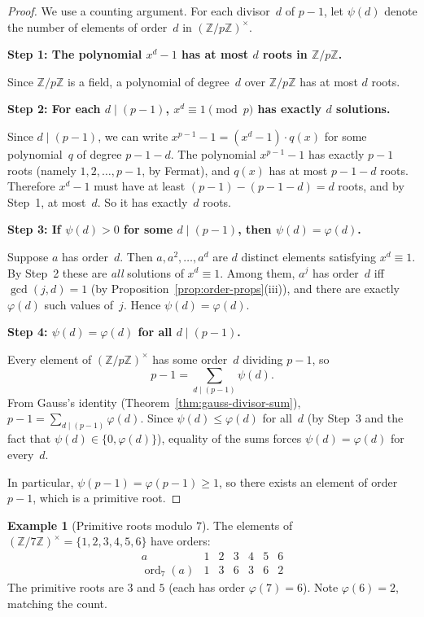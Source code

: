 \documentclass[12pt,a4paper,openany]{book}
\theoremstyle{definition}
\newtheorem{example}[definition]{Example}
\theoremstyle{plain}
\theoremstyle{remark}
\newcommand{\Z}{\mathbb{Z}}
\DeclareMathOperator{\ord}{ord}
\begin{document}
\begin{proof}
We use a counting argument.  For each divisor~$d$ of $p-1$, let
$\psi(d)$ denote the number of elements of order~$d$ in $(\Z/p\Z)^\times$.

\medskip\noindent
\textbf{Step 1: The polynomial $x^d - 1$ has at most $d$ roots in $\Z/p\Z$.}

Since $\Z/p\Z$ is a field, a polynomial of degree~$d$ over $\Z/p\Z$ has
at most $d$ roots.

\medskip\noindent
\textbf{Step 2: For each $d \mid (p-1)$, $x^d \equiv 1 \pmod{p}$ has
exactly $d$ solutions.}

Since $d \mid (p-1)$, we can write $x^{p-1} - 1 = (x^d - 1)\cdot q(x)$
for some polynomial~$q$ of degree $p-1-d$.  The polynomial $x^{p-1} - 1$
has exactly $p-1$ roots (namely $1, 2, \dots, p-1$, by Fermat), and $q(x)$
has at most $p-1-d$ roots.  Therefore $x^d - 1$ must have at least
$(p-1) - (p-1-d) = d$ roots, and by Step~1, at most~$d$.  So it has exactly~$d$
roots.

\medskip\noindent
\textbf{Step 3: If $\psi(d) > 0$ for some $d \mid (p-1)$, then $\psi(d) = \varphi(d)$.}

Suppose $a$ has order~$d$.  Then $a, a^2, \dots, a^d$ are $d$ distinct
elements satisfying $x^d \equiv 1$.  By Step~2 these are \emph{all}
solutions of $x^d \equiv 1$.  Among them, $a^j$ has order~$d$ iff
$\gcd(j,d) = 1$ (by Proposition~\ref{prop:order-props}(iii)), and there
are exactly $\varphi(d)$ such values of~$j$.  Hence $\psi(d) = \varphi(d)$.

\medskip\noindent
\textbf{Step 4: $\psi(d) = \varphi(d)$ for all $d \mid (p-1)$.}

Every element of $(\Z/p\Z)^\times$ has some order~$d$ dividing $p-1$, so
\[
  p - 1 = \sum_{d \mid (p-1)} \psi(d).
\]
From Gauss's identity (Theorem~\ref{thm:gauss-divisor-sum}),
$p - 1 = \sum_{d \mid (p-1)} \varphi(d)$.  Since $\psi(d) \le \varphi(d)$
for all~$d$ (by Step~3 and the fact that $\psi(d) \in \{0, \varphi(d)\}$),
equality of the sums forces $\psi(d) = \varphi(d)$ for every~$d$.

\medskip\noindent
In particular, $\psi(p-1) = \varphi(p-1) \ge 1$, so there exists an
element of order~$p-1$, which is a primitive root.
\end{proof}

\begin{example}[Primitive roots modulo $7$]
\label{ex:prim-root-7}
The elements of $(\Z/7\Z)^\times = \{1,2,3,4,5,6\}$ have orders:
\[
\begin{array}{c|cccccc}
  a & 1 & 2 & 3 & 4 & 5 & 6 \\ \hline
  \ord_7(a) & 1 & 3 & 6 & 3 & 6 & 2
\end{array}
\]
The primitive roots are $3$ and $5$ (each has order $\varphi(7) = 6$).
Note $\varphi(6) = 2$, matching the count.
\end{example}
\end{document}
